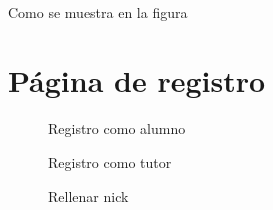 \documentclass[a4paper, 12pt]{book}
\begin{document}
\paragraph{}
Como se muestra en la figura


\newpage
\section{P\'agina de registro}
\begin{figure}[htbp] 
  \label{figura:registro}
  \centering
  \caption{Registro como alumno}
\end{figure}
\begin{figure}[htbp] 
  \label{figura:registro1}
  \centering
  \caption{Registro como tutor}
\end{figure}
\begin{figure}[htbp] 
  \label{figura:registro2}
  \centering
  \caption{Rellenar nick}
\end{figure}
\end{document}
